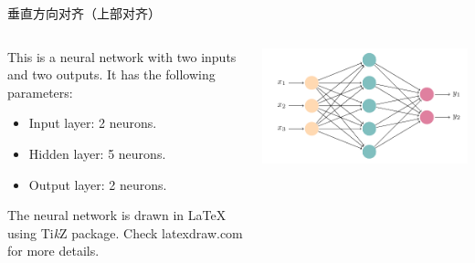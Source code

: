 \documentclass{ctexbeamer}
\begin{document}
\begin{frame}{垂直方向对齐（上部对齐）}
  \begin{columns}[T]
  \begin{column}{0.5\textwidth}
    This is a neural network with two inputs and two outputs. It has the following parameters:
    \begin{itemize}
      \item Input layer: 2 neurons.
      \item Hidden layer: 5 neurons.
      \item Output layer: 2 neurons.
    \end{itemize}
    The neural network is drawn in \LaTeX{} using Ti\textit{k}Z package. Check latexdraw.com for more details.
  \end{column}
  \begin{column}{0.5\textwidth}
    \includegraphics[width=\textwidth]{neural-networks.pdf}
  \end{column}
  \end{columns}
\end{frame}
\end{document}
